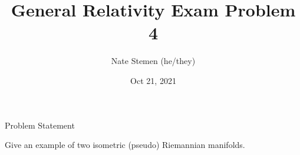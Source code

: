 \documentclass[11pt,aspectratio=1610,xcolor=dvipsnames]{beamer}
\title{General Relativity Exam Problem 4}
\date{Oct 21, 2021}
\author{Nate Stemen (he/they)}
\institute{AMATH 875}
\newcommand{\problemstatement}{Give an example of two isometric (pseudo) Riemannian manifolds.}
\begin{document}
\maketitle

\begin{frame}{Problem Statement}
	\large
	\begin{prob}
		\problemstatement
	\end{prob}
\end{frame}
\end{document}
